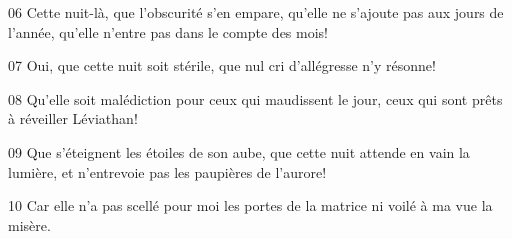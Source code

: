 
06 Cette nuit-là, que l’obscurité s’en empare, qu’elle ne s’ajoute pas aux jours de l’année, qu’elle n’entre pas dans le compte des mois!

07 Oui, que cette nuit soit stérile, que nul cri d’allégresse n’y résonne!

08 Qu’elle soit malédiction pour ceux qui maudissent le jour, ceux qui sont prêts à réveiller Léviathan!

09 Que s’éteignent les étoiles de son aube, que cette nuit attende en vain la lumière, et n’entrevoie pas les paupières de l’aurore!

10 Car elle n’a pas scellé pour moi les portes de la matrice ni voilé à ma vue la misère.
